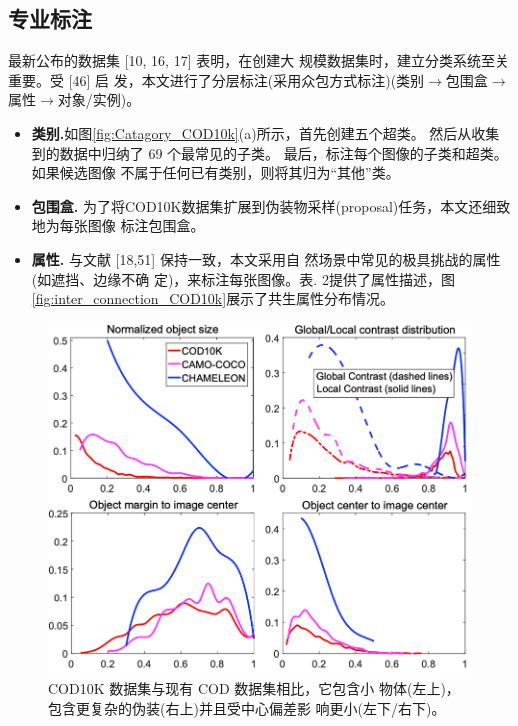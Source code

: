 \documentclass[final]{cvpr}
\renewcommand{\figref}[1]{图\ref{#1}}
\begin{document}
\subsection{专业标注}
最新公布的数据集 [10, 16, 17] 表明，在创建大 规模数据集时，建立分类系统至关重要。受 [46] 启 发，本文进行了分层标注(采用众包方式标注)(类别$\longrightarrow$包围盒$\longrightarrow$属性$\longrightarrow$对象/实例)。
\begin{itemize}
    \item  \textbf{类别.}如\figref{fig:Catagory_COD10k}(a)所示，首先创建五个超类。 然后从收集到的数据中归纳了 69 个最常见的子类。 最后，标注每个图像的子类和超类。如果候选图像 不属于任何已有类别，则将其归为“其他”类。
    \item \textbf{包围盒.} 为了将COD10K数据集扩展到伪装物采样(proposal)任务，本文还细致地为每张图像 标注包围盒。
    \item \textbf{属性. }与文献 [18,51] 保持一致，本文采用自 然场景中常见的极具挑战的属性 (如遮挡、边缘不确 定)，来标注每张图像。表. 2提供了属性描述，\figref{fig:inter_connection_COD10k}展示了共生属性分布情况。
\end{itemize}
\begin{figure}[tp]
    \centering
    \includegraphics[width=0.98\columnwidth]{COD_Zh_translate/figures/Graph_analyse_COD10k.png}\small
    \caption{ COD10K 数据集与现有 COD 数据集相比，它包含小 物体(左上)，包含更复杂的伪装(右上)并且受中心偏差影 响更小(左下/右下)。
}
    \label{fig:Graph_analyse_COD10k}
\end{figure}
\end{document}

